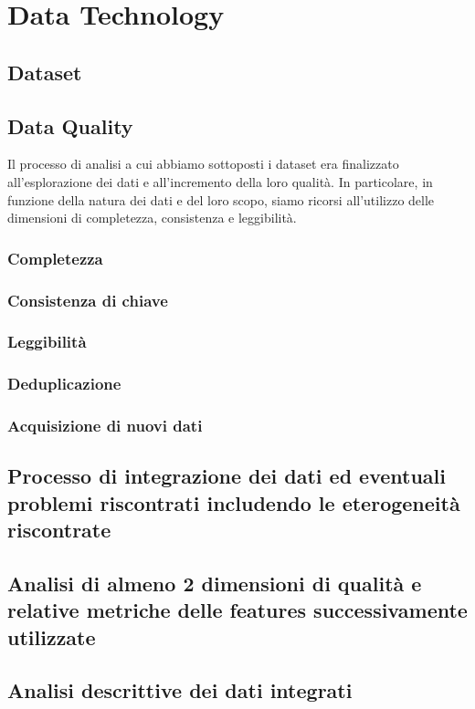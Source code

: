 \setcounter{chapter}{0}

\part{Data Technology}

\chapter{Dataset}

\chapter{Data Quality}
Il processo di analisi a cui abbiamo sottoposti i dataset era finalizzato all'esplorazione dei dati e all'incremento della loro qualità. In particolare, in funzione della natura dei dati e del loro scopo, siamo ricorsi all'utilizzo delle dimensioni di completezza, consistenza e leggibilità.


\section{Completezza}

\section{Consistenza di chiave}

\section{Leggibilità}

\section{Deduplicazione}

\section{Acquisizione di nuovi dati}

\chapter{Processo di integrazione dei dati ed eventuali problemi riscontrati includendo le eterogeneità riscontrate}



\chapter{Analisi di almeno 2 dimensioni di qualità e relative metriche delle features successivamente utilizzate}
\chapter{Analisi descrittive dei dati integrati}

